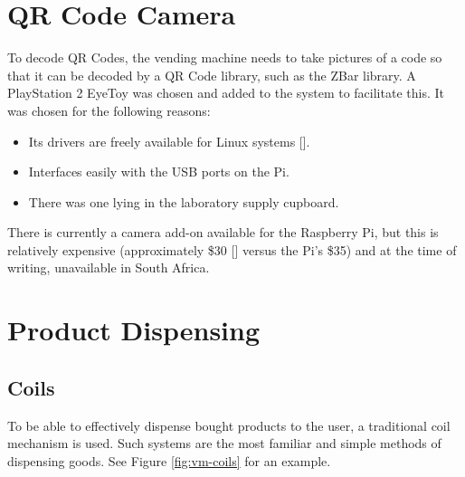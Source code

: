 \section{QR Code Camera}
\label{sec:webcam}

To decode QR Codes, the vending machine needs to take pictures of a code so that it can be
decoded by a QR Code library, such as the ZBar library. A PlayStation 2 EyeToy was
chosen and added to the system to facilitate this. It was chosen for the following reasons:

\begin{itemize}
  \item Its drivers are freely available for Linux systems [\cite{website:webcam-drivers}].
  \item Interfaces easily with the USB ports on the Pi.
  \item There was one lying in the laboratory supply cupboard.
\end{itemize}

There is currently a camera add-on available for the Raspberry Pi, but this is relatively
expensive (approximately \$30 [\cite{website:raspi-camera}] versus the Pi's \$35) and at
the time of writing, unavailable in South Africa.

\section{Product Dispensing}

\subsection{Coils}

To be able to effectively dispense bought products to the user, a traditional coil mechanism is
used. Such systems are the most familiar and simple methods of dispensing goods. See Figure
\ref{fig:vm-coils} for an example.

